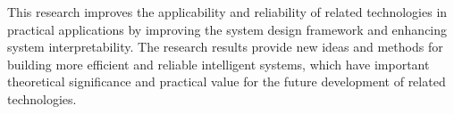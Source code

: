 \noindent\hspace{2em}This research improves the applicability and reliability of related technologies in practical applications by improving the system design framework and enhancing system interpretability. The research results provide new ideas and methods for building more efficient and reliable intelligent systems, which have important theoretical significance and practical value for the future development of related technologies.

\vspace{\baselineskip}
\endgroup

\clearpage
